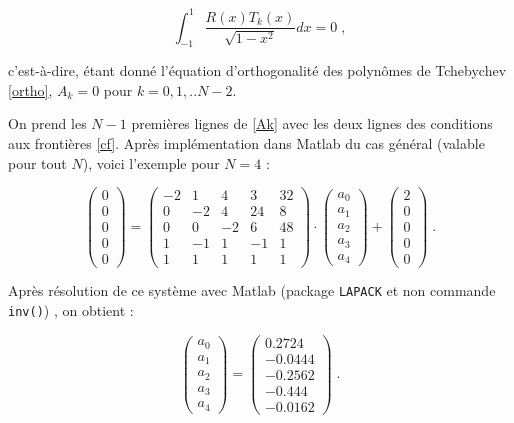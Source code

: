 \documentclass{report}
\begin{document}
\begin{equation}
\int_{-1}^1 \frac{R(x) T_k(x)}{\sqrt{1-x^2}} dx = 0\;,
\end{equation}

c'est-à-dire, étant donné l'équation d'orthogonalité des polynômes de Tchebychev \eqref{ortho}, $A_{k}=0$ pour $k=0,1,..N-2$.

On prend les $N-1$ premières lignes de \eqref{Ak} avec les deux lignes des conditions aux frontières \eqref{cf}. Après implémentation dans Matlab du cas général (valable pour tout $N$), voici l'exemple pour $N=4$ :

\begin{equation}
\begin{pmatrix}
 0\\ 
 0\\ 
 0\\ 
 0\\ 
 0
\end{pmatrix} =
\begin{pmatrix}
-2 & 1 & 4 & 3 & 32\\ 
0 & -2 & 4 & 24 & 8\\ 
0 & 0 & -2 & 6 & 48\\ 
1 & -1 & 1 & -1 & 1\\ 
1 & 1 & 1 & 1 & 1
\end{pmatrix} \cdot \begin{pmatrix}
 a_0\\ 
 a_1\\ 
 a_2\\ 
 a_3\\ 
 a_4
\end{pmatrix} +
\begin{pmatrix}
 2\\ 
 0\\ 
 0\\ 
 0\\ 
 0
\end{pmatrix}\;.
\end{equation}

Après résolution de ce système avec Matlab (package \texttt{LAPACK} et non commande \texttt{inv()}) , on obtient :

\begin{equation}
\begin{pmatrix}
 a_0\\ 
 a_1\\ 
 a_2\\ 
 a_3\\ 
 a_4
\end{pmatrix} =
\begin{pmatrix}
 0.2724\\ 
 -0.0444\\ 
 -0.2562\\ 
 -0.444\\ 
 -0.0162
\end{pmatrix}\;.
\end{equation}
\end{document}
